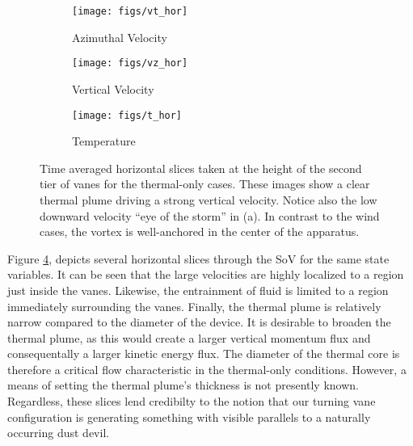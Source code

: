 \begin{figure}[htb]

 \begin{subfigure}{.33\textwidth}
  \centering
  \texttt{[image: figs/vt\_hor]}
  \caption{Azimuthal Velocity}
  \label{fig:vt-to}
 \end{subfigure}%
 \begin{subfigure}{.33\textwidth}
  \centering
  \texttt{[image: figs/vz\_hor]}
  \caption{Vertical Velocity}
  \label{fig:vz-to}
 \end{subfigure}%
 \begin{subfigure}{.33\textwidth}
  \centering
  \texttt{[image: figs/t\_hor]}
  \caption{Temperature}
  \label{fig:t-to}
 \end{subfigure}%

 \caption{Time averaged horizontal slices taken at the height of the
 second tier of vanes for the thermal-only cases. These images show a
 clear thermal plume driving a strong vertical velocity. Notice also the
 low downward velocity ``eye of the storm'' in (a). In contrast to the
 wind cases, the vortex is well-anchored in the center of the apparatus. }
 \label{fig:to-hor}
\end{figure}

Figure \ref{fig:to-hor}, depicts several horizontal slices
through the SoV for the same state variables. It can be seen that the
large velocities are highly localized to a region just inside the
vanes. Likewise, the entrainment of fluid is limited to a region
immediately surrounding the vanes. 
%
%
Finally, the thermal plume is relatively
narrow compared to the diameter of the device. It is desirable to
broaden the thermal plume, as this would create a larger vertical
momentum flux and consequentally a larger kinetic energy flux. 
The diameter of the thermal core is therefore a critical flow
characteristic in the thermal-only conditions. However, a means of
setting the thermal plume's thickness is not presently 
known. Regardless, these slices lend credibilty to the 
notion that our turning vane configuration is generating something with
visible parallels to a naturally occurring dust devil.   

